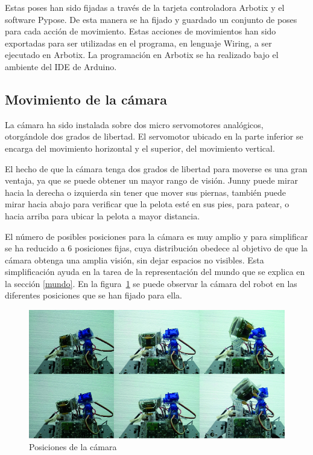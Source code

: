 Estas poses han sido fijadas a través de la tarjeta controladora Arbotix y el software Pypose. De esta manera se ha fijado y guardado un conjunto de poses para cada acción de movimiento. Estas acciones de movimientos han sido exportadas para ser utilizadas en el programa, en lenguaje Wiring, a ser ejecutado en Arbotix. La programación en Arbotix se ha realizado bajo el ambiente del IDE de Arduino. 


\subsection{Movimiento de la cámara}\label{movCamara}
La cámara ha sido instalada sobre dos micro servomotores analógicos, otorgándole dos grados de libertad. El servomotor ubicado en la parte inferior se encarga del movimiento horizontal y el superior, del movimiento vertical.

El hecho de  que la cámara tenga dos grados de libertad para moverse es una gran ventaja, ya que se puede obtener un mayor rango de visión. Junny puede mirar hacia la derecha o izquierda sin tener que mover sus piernas, también puede mirar hacia abajo para verificar que la pelota esté en sus pies, para patear, o hacia arriba para ubicar la pelota a mayor distancia.

El número de posibles posiciones para la cámara es muy amplio y para simplificar se ha reducido a 6 posiciones fijas, cuya distribución obedece al objetivo de que la cámara obtenga una amplia visión, sin dejar espacios no visibles. Esta simplificación ayuda en la tarea de la representación del mundo que se explica en la sección \ref{mundo}. En la figura~\ref{posicionesCam} se puede observar la cámara del robot en las diferentes posiciones que se han fijado para ella.  

\begin{figure}[hbtp]
\centering
\includegraphics[scale=0.5]{imagenes/Pantallazo.png}
\caption{Posiciones de la cámara }
\label{posicionesCam}
\end{figure}

